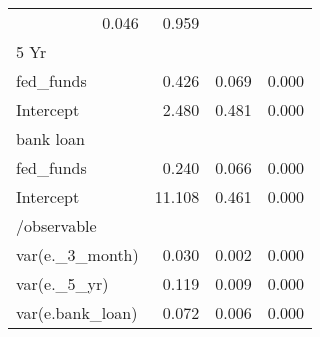 \begin{table}[!h]
\begin{tabular}{llll}
  \multicolumn{1}{r}{0.046} &
  \multicolumn{1}{r}{0.959} \\
\multicolumn{1}{l}{5 Yr} &
  \multicolumn{1}{|r}{} &
  \multicolumn{1}{r}{} &
  \multicolumn{1}{r}{} \\
\multicolumn{1}{l}{\hspace{1em}fed\_funds} &
  \multicolumn{1}{|r}{0.426} &
  \multicolumn{1}{r}{0.069} &
  \multicolumn{1}{r}{0.000} \\
\multicolumn{1}{l}{\hspace{1em}Intercept} &
  \multicolumn{1}{|r}{2.480} &
  \multicolumn{1}{r}{0.481} &
  \multicolumn{1}{r}{0.000} \\
\multicolumn{1}{l}{bank loan} &
  \multicolumn{1}{|r}{} &
  \multicolumn{1}{r}{} &
  \multicolumn{1}{r}{} \\
\multicolumn{1}{l}{\hspace{1em}fed\_funds} &
  \multicolumn{1}{|r}{0.240} &
  \multicolumn{1}{r}{0.066} &
  \multicolumn{1}{r}{0.000} \\
\multicolumn{1}{l}{\hspace{1em}Intercept} &
  \multicolumn{1}{|r}{11.108} &
  \multicolumn{1}{r}{0.461} &
  \multicolumn{1}{r}{0.000} \\
\multicolumn{1}{l}{/observable} &
  \multicolumn{1}{|r}{} &
  \multicolumn{1}{r}{} &
  \multicolumn{1}{r}{} \\
\multicolumn{1}{l}{\hspace{1em}var(e.\_3\_month)} &
  \multicolumn{1}{|r}{0.030} &
  \multicolumn{1}{r}{0.002} &
  \multicolumn{1}{r}{0.000} \\
\multicolumn{1}{l}{\hspace{1em}var(e.\_5\_yr)} &
  \multicolumn{1}{|r}{0.119} &
  \multicolumn{1}{r}{0.009} &
  \multicolumn{1}{r}{0.000} \\
\multicolumn{1}{l}{\hspace{1em}var(e.bank\_loan)} &
  \multicolumn{1}{|r}{0.072} &
  \multicolumn{1}{r}{0.006} &
  \multicolumn{1}{r}{0.000} \\
\cline{1-4}
\end{tabular}
\end{table}
